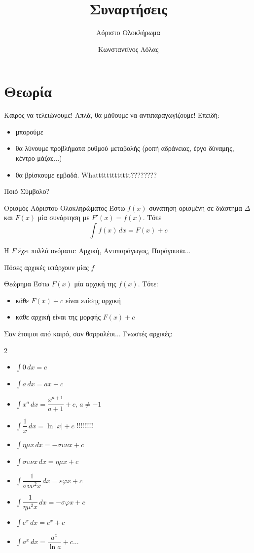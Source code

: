 \documentclass{presentation}
\title{Συναρτήσεις}
\subtitle{Αόριστο Ολοκλήρωμα}
\author[Λόλας]{Κωνσταντίνος Λόλας}
\begin{document}
\begin{frame}
  \titlepage
\end{frame}

\section{Θεωρία}
\begin{frame}{Καιρός να τελειώνουμε!}
  Απλά, θα μάθουμε να αντιπαραγωγίζουμε! Επειδή:
  \begin{itemize}[<+->]
    \item μπορούμε
    \item θα λύνουμε προβλήματα ρυθμού μεταβολής (ροπή αδράνειας, έργο δύναμης, κέντρο μάζας...)
    \item θα βρίσκουμε εμβαδά. Whattttttttttttt????????
  \end{itemize}
\end{frame}

\begin{frame}{Ποιό Σύμβολο?}
  \begin{block}{Ορισμός Αόριστου Ολοκληρώματος}
    Έστω $f(x)$ συνάτηση ορισμένη σε διάστημα $Δ$ και $F(x)$ μία συνάρτηση με $F'(x)=f(x)$. Τότε
    $$\int f(x) \, dx=F(x)+c$$
  \end{block}
  H $F$ έχει πολλά ονόματα: Αρχική, Αντιπαράγωγος, Παράγουσα...
\end{frame}

\begin{frame}{Πόσες αρχικές υπάρχουν μίας $f$}
  \begin{block}{Θεώρημα}
    Έστω $F(x)$ μία αρχική της $f(x)$. Τότε:
    \begin{itemize}
      \item κάθε $F(x)+c$ είναι επίσης αρχική
      \item κάθε αρχική είναι της μορφής $F(x)+c$
    \end{itemize}
  \end{block}
\end{frame}

\begin{frame}{Σαν έτοιμοι από καιρό, σαν θαρραλέοι...}
  Γνωστές αρχικές:
  \begin{multicols}{2}
    \begin{itemize}[<+->]
      \item $\int 0 \, dx=c$
      \item $\int a \, dx=ax+c$
      \item $\int x^a \, dx=\dfrac{x^{a+1}}{a+1}+c$, $a\ne -1$
      \item $\int \dfrac{1}{x} \, dx=\ln|x|+c$ !!!!!!!!!
      \item $\int ημx \, dx=-συνx+c$
      \item $\int συνx \, dx=ημx+c$
      \item $\int \dfrac{1}{συν^2x} \, dx=εφx+c$
      \item $\int \dfrac{1}{ημ^2x} \, dx=-σφx+c$
      \item $\int e^x \, dx=e^x+c$
      \item $\int a^x \, dx=\dfrac{a^x}{\ln a}+c$...
    \end{itemize}
  \end{multicols}
\end{frame}
\end{document}
